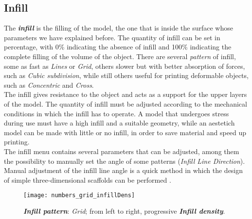 \subsection{Infill}
The \emph{\textbf{infill}} is the filling of the model, the one that is inside the surface whose parameters we have explained before. The quantity of infill can be set in percentage, with 0\% indicating the absence of infill and 100\% indicating the complete filling of the volume of the object. There are several \emph{pattern} of infill, some as fast as \emph{Lines} or \emph{Grid}, others slower but with better absorption of forces, such as \emph{Cubic subdivision}, while still others useful for printing deformable objects, such as \emph{Concentric} and \emph{Cross}. \\
The infill gives resistance to the object and acts as a support for the upper layers of the model. The quantity of infill must be adjusted according to the mechanical conditions in which the infill has to operate. A model that undergoes stress during use must have a high infill and a suitable geometry, while an aestetich model can be made with little or no infill, in order to save material and speed up printing.\\
The infill menu contains several parameters that can be adjusted, among them the possibility to manually set the angle of some patterns (\emph{Infill Line Direction}). Manual adjustment of the infill line angle is a quick method in which the design of simple three-dimensional scaffolds can be performed \parencite{Reference138}.

\begin{figure}[h]
    \centering
    \texttt{[image: numbers\_grid\_infillDens]}
    \caption{\emph{\textbf{Infill pattern}}: \emph{Grid}; from left to right, progressive \emph{\textbf{Infill density}}.}
    \label{fig:numbers_grid_infillDens}
\end{figure}
	

